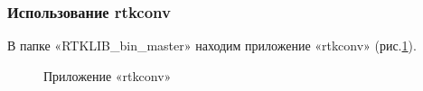 \documentclass[]{article}
\begin{document}
 \subsubsection{Использование rtkconv}
 В папке «RTKLIB\_bin\_master»  находим приложение «rtkconv» (рис.\ref{rtkconv}).
 	\begin{figure}[h!]
 	
 	\caption{Приложение «rtkconv»}
 	\label{rtkconv}
 \end{figure}
\end{document}
